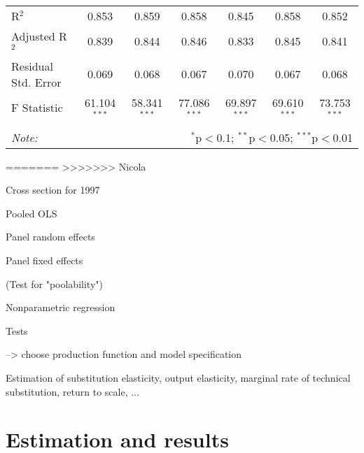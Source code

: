 \documentclass[12pt,a4paper]{article}\usepackage[]{graphicx}\usepackage[]{color}
\begin{document}
\begin{table}[!htbp]
\begin{tabular}{@{\extracolsep{5pt}}lcccccc}
R$^{2}$ & 0.853 & 0.859 & 0.858 & 0.845 & 0.858 & 0.852 \\ 
Adjusted R$^{2}$ & 0.839 & 0.844 & 0.846 & 0.833 & 0.845 & 0.841 \\ 
Residual Std. Error & 0.069 & 0.068 & 0.067 & 0.070 & 0.067 & 0.068 \\ 
F Statistic & 61.104$^{***}$ & 58.341$^{***}$ & 77.086$^{***}$ & 69.897$^{***}$ & 69.610$^{***}$ & 73.753$^{***}$ \\ 
\hline 
\hline \\[-1.8ex] 
\textit{Note:}  & \multicolumn{6}{r}{$^{*}$p$<$0.1; $^{**}$p$<$0.05; $^{***}$p$<$0.01} \\ 
\end{tabular} 
\end{table} 

=======
>>>>>>> Nicola





Cross section for 1997

Pooled OLS

Panel random effects

Panel fixed effects

(Test for "poolability")

Nonparametric regression

Tests

--> choose production function and model specification

Estimation of substitution elasticity, output elasticity, marginal rate of technical substitution, return to scale, ...












\section{Estimation and results}
\end{document}
